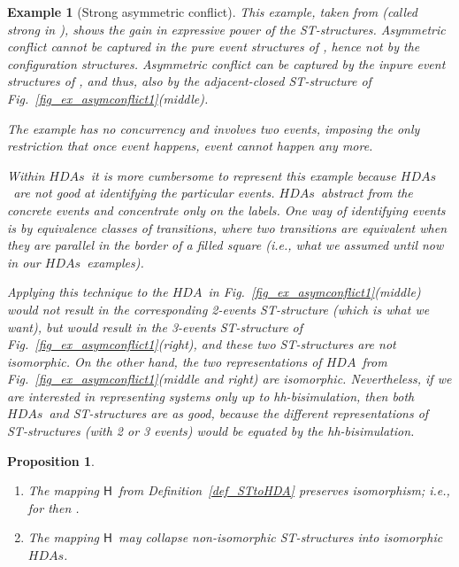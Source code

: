 \documentclass[submission,copyright,creativecommons]{eptcs}
\newtheorem{proposition}[theorem]{Proposition}
\newtheorem{example}[theorem]{Example}
\newcommand\HDA{\ensuremath{\mathit{HDA}}}
\newcommand\HDAs{\ensuremath{\mathit{HDAs}}}
\newcommand\stintoh{\ensuremath{\mathsf{H}}}
\begin{document}
\begin{example}[Strong asymmetric conflict]\label{example_asym_confl}
This example, taken from \cite[Ex.3]{GlabbeekP09configStruct} (called \textit{strong} in \cite[p.22]{Pratt03trans_cancel}), shows the gain in expressive power of the ST-structures. Asymmetric conflict cannot be captured in the \emph{pure event structures} of \cite[Def.1.5]{GlabbeekP09configStruct}, hence not by the configuration structures. Asymmetric conflict can be captured by the inpure event structures of \cite{GlabbeekP09configStruct}, and thus, also by the adjacent-closed ST-structure of Fig.~\ref{fig_ex_asymconflict1}(middle).

The example has no concurrency and involves two events, imposing the only restriction that once event  happens, event  cannot happen any more.

Within \HDAs\ it is more cumbersome to represent this example because \HDAs\ are not good at identifying the particular events. \HDAs\ abstract from the concrete events and concentrate only on the labels. 
One way of identifying events is by equivalence classes of transitions, where two transitions are equivalent when they are parallel in the border of a filled square (i.e., what we assumed until now in our \HDAs\ examples).


Applying this technique to the \HDA\ in Fig.~\ref{fig_ex_asymconflict1}(middle) would not result in the corresponding 2-events ST-structure (which is what we want), but would result in the 3-events ST-structure of Fig.~\ref{fig_ex_asymconflict1}(right), and these two ST-structures are not isomorphic.
On the other hand, the two representations of \HDA\ from Fig.~\ref{fig_ex_asymconflict1}(middle and right) are isomorphic. 
Nevertheless, if we are interested in representing systems only up to hh-bisimulation, then both \HDAs\ and ST-structures are as good, because the different representations of ST-structures (with 2 or 3 events) would be equated by the hh-bisimulation.
\end{example}



\begin{proposition}\label{prop_stintoh_iso}
\ 

\begin{enumerate}
\item\label{prop_stintoh_iso_1} The mapping \stintoh\ from Definition~\ref{def_STtoHDA} preserves isomorphism; i.e., for  then .

\item\label{prop_stintoh_iso_collapse} The mapping \stintoh\ may collapse non-isomorphic ST-structures into isomorphic \HDAs.
\end{enumerate}
\end{proposition}
\end{document}

